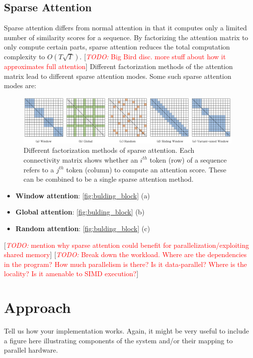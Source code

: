 \documentclass[11pt]{article}
\newcommand{\todo}[1]{[\textcolor{red}{\textit{TODO: }{#1}}]}
\begin{document}
\subsection{Sparse Attention}
Sparse attention differs from normal attention in that it computes only a limited number of similarity scores for a sequence. By factorizing the attention matrix to only compute certain parts, sparse attention reduces the total computation complexity to $O(T\sqrt{T})$. \todo{Big Bird disc. more stuff about how it approximates full attention} Different factorization methods \cite{zaheer2020big, beltagy2020longformer} of the attention matrix lead to different sparse attention modes. Some such sparse attention modes are:
\begin{figure}[h]
  \centering
  \includegraphics[width=\linewidth]{figures/building_block.png}
  \caption{Different factorization methods of sparse attention.  Each connectivity matrix shows whether an $i^{th}$ token (row) of a sequence refers to a $j^{th}$ token (column) to compute an attention score. These can be combined to be a single sparse attention method.}
 \label{fig:bulding_block}
\end{figure}
\begin{itemize}
    \item \textbf{Window attention}: \autoref{fig:bulding_block} (a)
    \item \textbf{Global attention}: \autoref{fig:bulding_block} (b)
    \item \textbf{Random attention}: \autoref{fig:bulding_block} (c)
\end{itemize}
\todo{mention why sparse attention could benefit for parallelization/exploiting shared memory}
\todo{Break down the workload. Where are the dependencies in the program? How much parallelism is there? Is it data-parallel? Where is the locality? Is it amenable to SIMD execution?}
\section{Approach}

Tell us how your implementation works. Again, it might be very useful to include a figure here illustrating components of the system and/or their mapping to parallel hardware.
\end{document}
